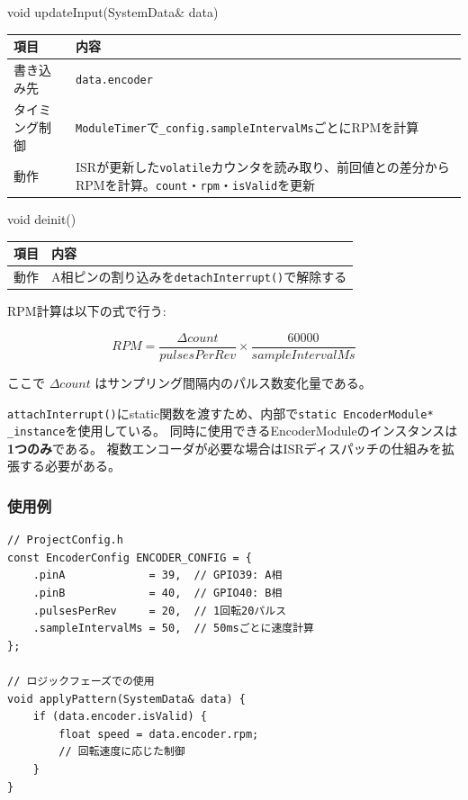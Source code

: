 \begin{funcblock}{void updateInput(SystemData\& data)}
\begin{tabularx}{\textwidth}{l X}
\toprule
\textbf{項目} & \textbf{内容} \\
\midrule
書き込み先     & \texttt{data.encoder} \\
タイミング制御 & \texttt{ModuleTimer}で\texttt{\_config.sampleIntervalMs}ごとにRPMを計算 \\
動作           & ISRが更新した\texttt{volatile}カウンタを読み取り、前回値との差分からRPMを計算。\texttt{count}・\texttt{rpm}・\texttt{isValid}を更新 \\
\bottomrule
\end{tabularx}
\end{funcblock}

\begin{funcblock}{void deinit()}
\begin{tabularx}{\textwidth}{l X}
\toprule
\textbf{項目} & \textbf{内容} \\
\midrule
動作   & A相ピンの割り込みを\texttt{detachInterrupt()}で解除する \\
\bottomrule
\end{tabularx}
\end{funcblock}

\begin{notebox}[RPM計算式]
RPM計算は以下の式で行う:

\vspace{0.3em}
$$RPM = \frac{\Delta count}{pulsesPerRev} \times \frac{60000}{sampleIntervalMs}$$
\vspace{0.3em}

\noindent ここで $\Delta count$ はサンプリング間隔内のパルス数変化量である。
\end{notebox}

\begin{cautionbox}[シングルインスタンス制約]
\texttt{attachInterrupt()}にstatic関数を渡すため、内部で\texttt{static EncoderModule* \_instance}を使用している。
同時に使用できるEncoderModuleのインスタンスは\textbf{1つのみ}である。
複数エンコーダが必要な場合はISRディスパッチの仕組みを拡張する必要がある。
\end{cautionbox}

\subsubsection{使用例}

\begin{lstlisting}[style=cppstyle, caption={EncoderModuleの使用例}]
// ProjectConfig.h
const EncoderConfig ENCODER_CONFIG = {
    .pinA             = 39,  // GPIO39: A相
    .pinB             = 40,  // GPIO40: B相
    .pulsesPerRev     = 20,  // 1回転20パルス
    .sampleIntervalMs = 50,  // 50msごとに速度計算
};

// ロジックフェーズでの使用
void applyPattern(SystemData& data) {
    if (data.encoder.isValid) {
        float speed = data.encoder.rpm;
        // 回転速度に応じた制御
    }
}
\end{lstlisting}
